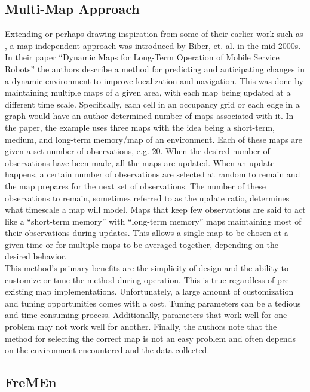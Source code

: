   \subsection{ Multi-Map Approach }
  Extending or perhaps drawing inspiration from some of their earlier work such as
  \cite{Arbuckle2002}, a map-independent approach was introduced by Biber, et. al. in the mid-2000s.
  In their paper ``Dynamic Maps for Long-Term Operation of Mobile Service Robots''
  the authors describe a method for predicting and anticipating changes in
  a dynamic environment to improve localization and navigation. This was done
  by maintaining multiple maps of a given area, with each map
  being updated at a different time scale. Specifically, each cell in an occupancy
  grid or each edge in a graph would have an author-determined number of maps
  associated with it. In the paper, the example uses three maps with the
  idea being a short-term, medium, and long-term memory/map of an environment.
  Each of these maps are given a set number of observations, e.g. 20. When
  the desired number of observations have been made, all the maps are updated. When
  an update happens, a certain number of observations are selected at random to
  remain and the map prepares for the next set of observations. The number of these
  observations to remain, sometimes referred to as the update ratio, determines
  what timescale a map will model. Maps that keep few observations are said to
  act like a ``short-term memory'' with ``long-term memory'' maps maintaining most of
  their observations during updates. This allows a single map to be chosen at a given
  time or for multiple maps to be averaged together, depending on the desired behavior. \\

  This method's primary benefits are the simplicity of design and the ability to
  customize or tune the method during operation. This is true regardless of pre-existing map
  implementations. Unfortunately, a large amount of customization and tuning
  opportunities comes with a cost.
  Tuning parameters can be a tedious and time-consuming process.
  Additionally, parameters that work well for one problem may not work well for
  another. Finally, the authors note that the method for selecting
  the correct map is not an easy problem and often depends on the environment
  encountered and the data collected. \\


  \subsection{ FreMEn }

